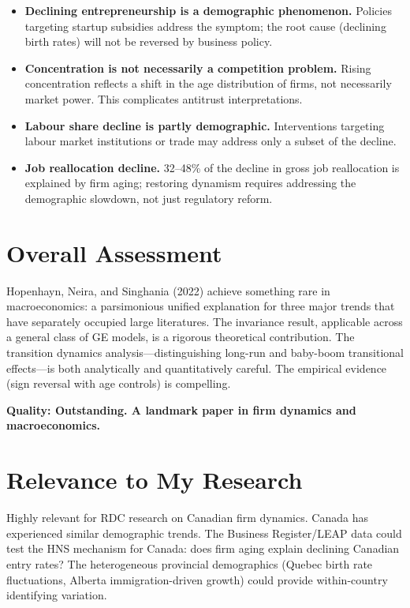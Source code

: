\begin{itemize}
  \item \textbf{Declining entrepreneurship is a demographic phenomenon.}
    Policies targeting startup subsidies address the symptom; the root cause
    (declining birth rates) will not be reversed by business policy.
  \item \textbf{Concentration is not necessarily a competition problem.}
    Rising concentration reflects a shift in the age distribution of firms,
    not necessarily market power. This complicates antitrust interpretations.
  \item \textbf{Labour share decline is partly demographic.} Interventions
    targeting labour market institutions or trade may address only a subset
    of the decline.
  \item \textbf{Job reallocation decline.} 32--48\% of the decline in gross
    job reallocation is explained by firm aging; restoring dynamism requires
    addressing the demographic slowdown, not just regulatory reform.
\end{itemize}

\section{Overall Assessment}

Hopenhayn, Neira, and Singhania (2022) achieve something rare in
macroeconomics: a parsimonious unified explanation for three major trends
that have separately occupied large literatures. The invariance result,
applicable across a general class of GE models, is a rigorous theoretical
contribution. The transition dynamics analysis---distinguishing long-run
and baby-boom transitional effects---is both analytically and quantitatively
careful. The empirical evidence (sign reversal with age controls) is
compelling.

\textbf{Quality: Outstanding. A landmark paper in firm dynamics and
macroeconomics.}

\section{Relevance to My Research}

Highly relevant for RDC research on Canadian firm dynamics. Canada has
experienced similar demographic trends. The Business Register/LEAP data
could test the HNS mechanism for Canada: does firm aging explain declining
Canadian entry rates? The heterogeneous provincial demographics (Quebec
birth rate fluctuations, Alberta immigration-driven growth) could provide
within-country identifying variation.

